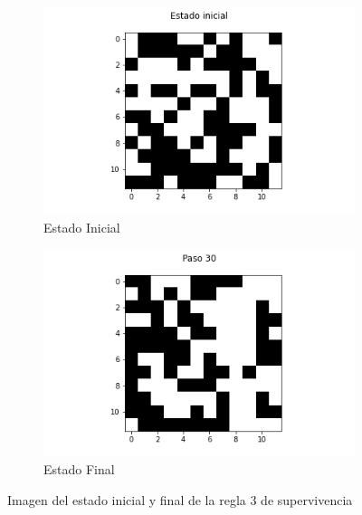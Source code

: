 \documentclass{article}
\begin{document}
\begin{figure}[H]
\centering
\begin{subfigure}[b]{0.45\linewidth}
\includegraphics[width=\linewidth]{p2_r3_t00_p.png}
\caption{Estado Inicial}
\end{subfigure}
\begin{subfigure}[b]{0.45\linewidth}
\includegraphics[width=\linewidth]{p2_r3_t30_p.png}
\caption{Estado Final}
\end{subfigure}
\caption{Imagen del estado inicial y final de la regla 3 de supervivencia}
\label{fig:westminster}
\end{figure}
\end{document}
